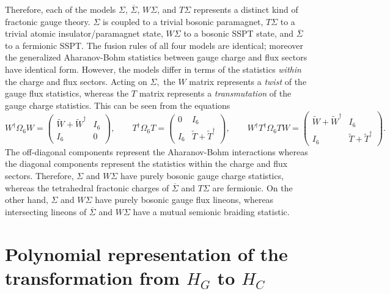 \documentclass[prx,twocolumn,superscriptaddress,nofootinbib,showpacs,notitlepage]{revtex4-2}
\begin{document}
Therefore, each of the models $\Sigma$, $\overline{\Sigma}$, $W\Sigma$, and $T\Sigma$ represents a distinct kind of fractonic gauge theory. $\Sigma$ is coupled to a trivial bosonic paramagnet, $T\Sigma$ to a trivial atomic insulator/paramagnet state, $W\Sigma$ to a bosonic SSPT state, and $\overline{\Sigma}$ to a fermionic SSPT. The fusion rules of all four models are identical; moreover the generalized Aharanov-Bohm statistics between gauge charge and flux sectors have identical form. However, the models differ in terms of the statistics \textit{within} the charge and flux sectors. Acting on $\Sigma,$ the $W$ matrix represents a \textit{twist} of the gauge flux statistics, whereas the $T$ matrix represents a \textit{transmutation} of the gauge charge statistics. 
This can be seen from the equations
\begin{equation}
    W^\dagger\Omega_{6} W=\begin{pmatrix}
        \widetilde{W}+\widetilde{W}^\dagger&I_6\\I_6&0
    \end{pmatrix},\qquad
    T^\dagger\Omega_{6} T=\begin{pmatrix}
        0&I_6\\I_6&\widetilde{T}+\widetilde{T}^\dagger
    \end{pmatrix},\qquad
    W^\dagger T^\dagger\Omega_{6} TW=\begin{pmatrix}
        \widetilde{W}+\widetilde{W}^\dagger&I_6\\I_6&\widetilde{T}+\widetilde{T}^\dagger
    \end{pmatrix}.
    \label{eqn:TWprops}
\end{equation}
The off-diagonal components represent the Aharanov-Bohm interactions whereas the diagonal components represent the statistics within the charge and flux sectors. Therefore, $\Sigma$ and $W\Sigma$ have purely bosonic gauge charge statistics, whereas the tetrahedral fractonic charges of $\overline{\Sigma}$ and $T\Sigma$ are fermionic. On the other hand, $\Sigma$ and $W\Sigma$ have purely bosonic gauge flux lineons, whereas intersecting lineons of $\overline{\Sigma}$ and $W\Sigma$ have a mutual semionic braiding statistic.

\section{Polynomial representation of the transformation from $H_G$ to $H_C$}
\label{app:Polynomial}
\end{document}
